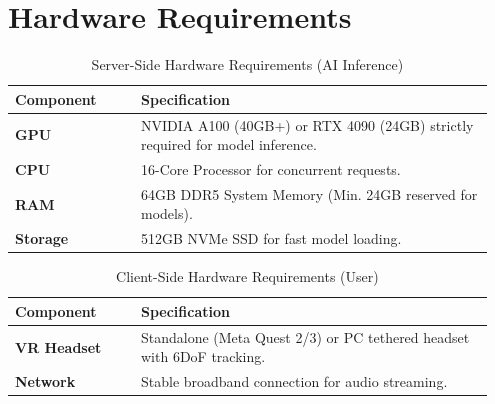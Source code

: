\section{Hardware Requirements}
\begin{table}[H]
\centering
\renewcommand{\arraystretch}{1.3}
\caption{Server-Side Hardware Requirements (AI Inference)}
\label{tab:hardware-server-req}
\begin{tabular}{|p{0.25\linewidth}|p{0.7\linewidth}|}
\hline
\rowcolor{gray!15} \textbf{Component} & \textbf{Specification} \\ \hline
\textbf{GPU} & NVIDIA A100 (40GB+) or RTX 4090 (24GB) strictly required for model inference. \\ \hline
\textbf{CPU} & 16-Core Processor for concurrent requests. \\ \hline
\textbf{RAM} & 64GB DDR5 System Memory (Min. 24GB reserved for models). \\ \hline
\textbf{Storage} & 512GB NVMe SSD for fast model loading. \\ \hline
\end{tabular}
\end{table}

\begin{table}[H]
\centering
\renewcommand{\arraystretch}{1.3}
\caption{Client-Side Hardware Requirements (User)}
\label{tab:hardware-client-req}
\begin{tabular}{|p{0.25\linewidth}|p{0.7\linewidth}|}
\hline
\rowcolor{gray!15} \textbf{Component} & \textbf{Specification} \\ \hline
\textbf{VR Headset} & Standalone (Meta Quest 2/3) or PC tethered headset with 6DoF tracking. \\ \hline
\textbf{Network} & Stable broadband connection for audio streaming. \\ \hline
\end{tabular}
\end{table}

